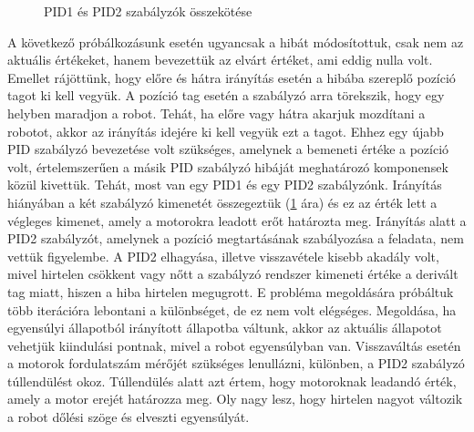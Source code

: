 \begin{figure}
	\centering
	\caption{PID1 és PID2 szabályzók összekötése}
	\label{pidSum}
\end{figure}


A következő próbálkozásunk esetén ugyancsak a hibát módosítottuk, csak nem az aktuális értékeket, hanem bevezettük az elvárt értéket, ami eddig nulla volt. Emellet rájöttünk, hogy előre és hátra irányítás esetén a hibába szereplő pozíció tagot ki kell vegyük. A pozíció tag esetén a szabályzó arra törekszik, hogy egy helyben maradjon a robot. Tehát, ha előre vagy hátra akarjuk mozdítani a robotot, akkor az irányítás idejére ki kell vegyük ezt a tagot. Ehhez egy újabb PID szabályzó bevezetése volt szükséges, amelynek a bemeneti értéke a pozíció volt, értelemszerűen a másik PID szabályzó hibáját meghatározó komponensek közül kivettük. Tehát, most van egy PID1 és egy PID2 szabályzónk. Irányítás hiányában a két szabályzó kimenetét összegeztük (\ref{pidSum} ára) és ez az érték lett a végleges kimenet, amely a motorokra leadott erőt határozta meg. Irányítás alatt a PID2 szabályzót, amelynek a pozíció megtartásának szabályozása a feladata, nem vettük figyelembe. A PID2 elhagyása, illetve visszavétele kisebb akadály volt, mivel hirtelen csökkent vagy nőtt a szabályzó rendszer kimeneti értéke a derivált tag miatt, hiszen a hiba hirtelen megugrott. E probléma megoldására próbáltuk több iterációra lebontani a különbséget, de ez nem volt elégséges. Megoldása, ha egyensúlyi állapotból irányított állapotba váltunk, akkor az aktuális állapotot vehetjük kiindulási pontnak, mivel a robot egyensúlyban van. Visszaváltás esetén a motorok fordulatszám mérőjét szükséges lenullázni, különben, a PID2 szabályzó túllendülést okoz. Túllendülés alatt azt értem, hogy motoroknak leadandó érték, amely a motor erejét határozza meg. Oly nagy lesz, hogy hirtelen nagyot változik a robot dőlési szöge és elveszti egyensúlyát.

